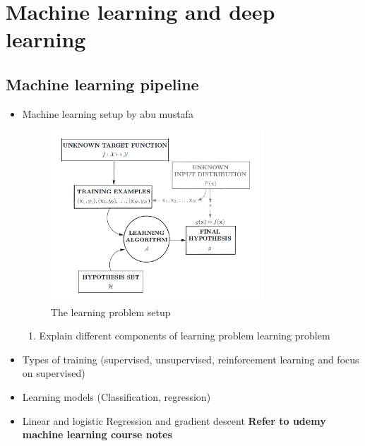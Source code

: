 \section{Machine learning and deep learning}
\subsection{Machine learning pipeline}
    \begin{itemize}
        \item Machine learning setup by abu mustafa 
        \begin{figure}[t]
            \includegraphics[width=8cm]{thesis/figures/Learning problem.PNG}
            \centering
            \caption{The learning problem setup}
            \label{fig:The learning problem setup}
        \end{figure}
        \begin{enumerate}
            \item Explain different components of learning problem  learning problem 
            
        \end{enumerate}
        \item Types of training (supervised, unsupervised, reinforcement learning and focus on supervised)
        \item Learning models (Classification, regression)
        \item Linear and logistic Regression and gradient descent 
        \textbf{Refer to udemy machine learning course notes}
    \end{itemize}
